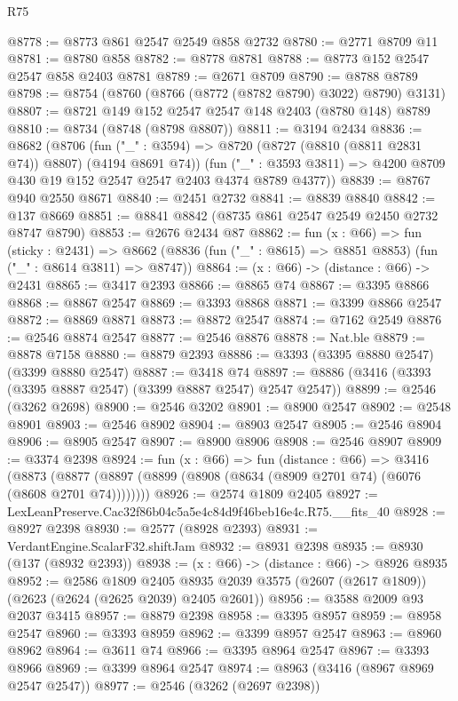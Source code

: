 \begin{lexlean}{R75}
\begin{coremodule}
@8778 := @8773 @861 @2547 @2549 @858 @2732
@8780 := @2771 @8709 @11
@8781 := @8780 @858
@8782 := @8778 @8781
@8788 := @8773 @152 @2547 @2547 @858 @2403 @8781
@8789 := @2671 @8709
@8790 := @8788 @8789
@8798 := @8754 (@8760 (@8766 (@8772 (@8782 @8790) @3022) @8790) @3131)
@8807 := @8721 @149 @152 @2547 @2547 @148 @2403 (@8780 @148) @8789
@8810 := @8734 (@8748 (@8798 @8807))
@8811 := @3194 @2434
@8836 := @8682
    (@8706
      (fun ("_" : @3594) => @8720 (@8727 (@8810 (@8811 @2831 @74)) @8807) (@4194 @8691 @74))
      (fun ("_" : @3593 @3811) => @4200 @8709 @430 @19 @152 @2547 @2547 @2403 @4374 @8789 @4377))
@8839 := @8767 @940 @2550 @8671
@8840 := @2451 @2732
@8841 := @8839 @8840
@8842 := @137 @8669
@8851 := @8841 @8842 (@8735 @861 @2547 @2549 @2450 @2732 @8747 @8790)
@8853 := @2676 @2434 @87
@8862 := fun (x : @66) =>
  fun (sticky : @2431) =>
  @8662 (@8836 (fun ("_" : @8615) => @8851 @8853) (fun ("_" : @8614 @3811) => @8747))
@8864 := (x : @66) -> (distance : @66) -> @2431
@8865 := @3417 @2393
@8866 := @8865 @74
@8867 := @3395 @8866
@8868 := @8867 @2547
@8869 := @3393 @8868
@8871 := @3399 @8866 @2547
@8872 := @8869 @8871
@8873 := @8872 @2547
@8874 := @7162 @2549
@8876 := @2546 @8874 @2547
@8877 := @2546 @8876
@8878 := Nat.ble
@8879 := @8878 @7158
@8880 := @8879 @2393
@8886 := @3393 (@3395 @8880 @2547) (@3399 @8880 @2547)
@8887 := @3418 @74
@8897 := @8886 (@3416 (@3393 (@3395 @8887 @2547) (@3399 @8887 @2547) @2547 @2547))
@8899 := @2546 (@3262 @2698)
@8900 := @2546 @3202
@8901 := @8900 @2547
@8902 := @2548 @8901
@8903 := @2546 @8902
@8904 := @8903 @2547
@8905 := @2546 @8904
@8906 := @8905 @2547
@8907 := @8900 @8906
@8908 := @2546 @8907
@8909 := @3374 @2398
@8924 := fun (x : @66) =>
  fun (distance : @66) =>
  @3416 (@8873 (@8877 (@8897 (@8899 (@8908 (@8634 (@8909 @2701 @74) (@6076 (@8608 @2701 @74))))))))
@8926 := @2574 @1809 @2405
@8927 := LexLeanPreserve.Cac32f86b04c5a5e4c84d9f46beb16e4c.R75.__fits_40
@8928 := @8927 @2398
@8930 := @2577 (@8928 @2393)
@8931 := VerdantEngine.ScalarF32.shiftJam
@8932 := @8931 @2398
@8935 := @8930 (@137 (@8932 @2393))
@8938 := (x : @66) -> (distance : @66) -> @8926 @8935
@8952 := @2586
    @1809
    @2405
    @8935
    @2039
    @3575
    (@2607 (@2617 @1809))
    (@2623 (@2624 (@2625 @2039) @2405 @2601))
@8956 := @3588 @2009 @93 @2037 @3415
@8957 := @8879 @2398
@8958 := @3395 @8957
@8959 := @8958 @2547
@8960 := @3393 @8959
@8962 := @3399 @8957 @2547
@8963 := @8960 @8962
@8964 := @3611 @74
@8966 := @3395 @8964 @2547
@8967 := @3393 @8966
@8969 := @3399 @8964 @2547
@8974 := @8963 (@3416 (@8967 @8969 @2547 @2547))
@8977 := @2546 (@3262 (@2697 @2398))

\end{coremodule}
\end{lexlean}
